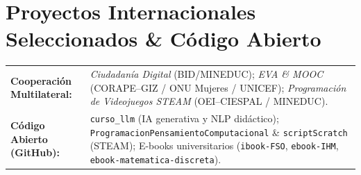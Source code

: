 \documentclass[10pt,a4paper]{article}
\begin{document}
\section{Proyectos Internacionales Seleccionados \& Código Abierto}
\begin{tabularx}{\textwidth}{@{}p{4.2cm} X@{}}
\textbf{\textcolor{primary}{Cooperación Multilateral:}} & \textit{Ciudadanía Digital} (BID/MINEDUC); \textit{EVA \& MOOC} (CORAPE–GIZ / ONU Mujeres / UNICEF); \textit{Programación de Videojuegos STEAM} (OEI–CIESPAL / MINEDUC).\\
\textbf{\textcolor{primary}{Código Abierto (GitHub):}} & \texttt{curso\_llm} (IA generativa y NLP didáctico); \texttt{ProgramacionPensamientoComputacional} \& \texttt{scriptScratch} (STEAM); E-books universitarios (\texttt{ibook-FSO}, \texttt{ebook-IHM}, \texttt{ebook-matematica-discreta}).\\
\end{tabularx}
\end{document}
